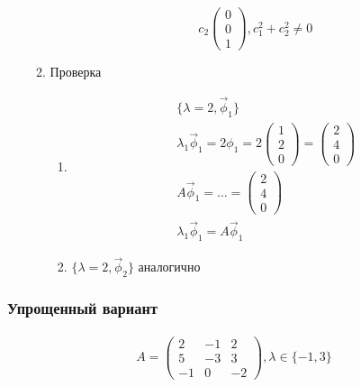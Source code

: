 \documentclass{article}
\begin{document}
\begin{enumerate}
\begin{enumerate}
\[			c_2 \begin{pmatrix} 0 \\ 0 \\ 1 \end{pmatrix},
			c_1^2 + c_2^2 \ne 0
		\]
		\item Проверка
		\begin{enumerate}
			\item \begin{gather*}
				\{ \lambda = 2, \vec{\phi}_1 \} \\
				\lambda_1 \vec{\phi}_1 = 2\phi_1 = 2 \begin{pmatrix}
					1 \\ 2 \\ 0
				\end{pmatrix} = \begin{pmatrix}
					2 \\ 4 \\ 0
				\end{pmatrix} \\
				A \vec{\phi}_1 = \dots = \begin{pmatrix}
					2 \\ 4 \\ 0
				\end{pmatrix} \\
				\lambda_1 \vec{\phi}_1 = A \vec{\phi}_1 
			\end{gather*}
			\item $\{ \lambda = 2, \vec{\phi}_2 \}$ аналогично
		\end{enumerate}
	\end{enumerate}
\end{enumerate}

\subsubsection{Упрощенный вариант}

\begin{gather*}
	A = \begin{pmatrix}
		2 & -1 & 2 \\
		5 & -3 & 3 \\
		-1 & 0 & -2
	\end{pmatrix},
	\lambda \in \{ -1, 3 \}
\end{gather*}
\end{document}
